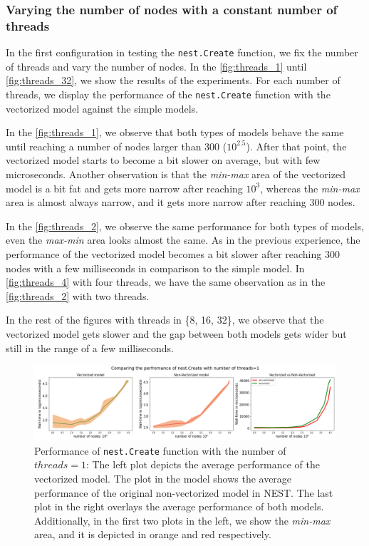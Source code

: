 \subsubsection*{Varying the number of nodes with a constant number of threads}

 In the first configuration in testing the \texttt{nest.Create} function, we fix the number of threads and vary the number of nodes. In the  \autoref{fig:threads_1} until \autoref{fig:threads_32}, we show the results of the experiments. For each number of threads, we display the performance of the \texttt{nest.Create} function with the vectorized model against the simple models. 


In the \autoref{fig:threads_1}, we observe that both types of models behave the same until reaching a number of nodes larger than 300 ($10^{2.5}$). After that point, the vectorized model starts to become a bit slower on average, but with few microseconds. Another observation is that the \emph{min-max} area of the vectorized model is a bit fat and gets more narrow after reaching $10^3$, whereas the \emph{min-max} area is almost always narrow, and it gets more narrow after reaching 300 nodes.

In the \autoref{fig:threads_2}, we observe the same performance for both types of models, even the \emph{max-min} area looks almost the same. As in the previous experience, the performance of the vectorized model becomes a bit slower after reaching 300 nodes with a few milliseconds in comparison to the simple model. In  \autoref{fig:threads_4} with four threads, we have the same observation as in the  \autoref{fig:threads_2} with two threads.

In the rest of the figures with threads in \{8, 16, 32\}, we observe that the vectorized model gets slower and the gap between both models gets wider but still in the range of a few milliseconds.

\begin{figure}[ht!]
    \centering
    \includegraphics[width=\textwidth]{src/pic/thread_1.png}
    \caption{Performance of \texttt{nest.Create} function with the number of $threads=1$: The left plot depicts the average performance of the vectorized model. The plot in the model shows the average performance of the original non-vectorized model in NEST. The last plot in the right overlays the average performance of both models. Additionally, in the first two plots in the left, we show the \emph{min-max} area, and it is depicted in orange and red respectively.}
    \label{fig:threads_1}
\end{figure}

